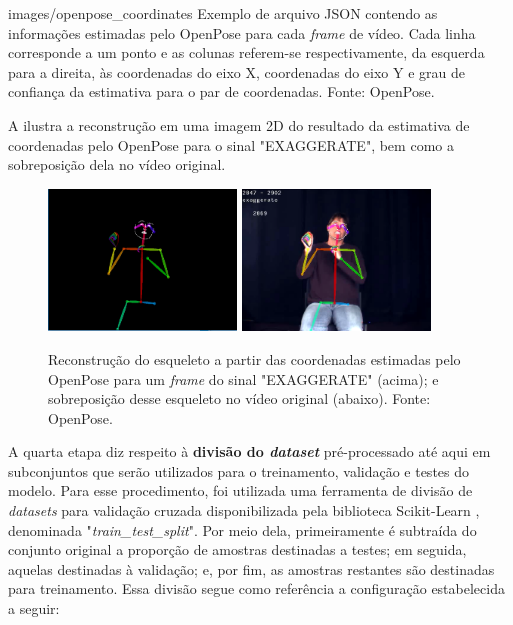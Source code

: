     {images/openpose_coordinates}
    {Exemplo de arquivo JSON contendo as informações estimadas pelo OpenPose para cada \textit{frame} de vídeo. Cada linha corresponde a um ponto e as colunas referem-se respectivamente, da esquerda para a direita, às coordenadas do eixo X, coordenadas do eixo Y e grau de confiança da estimativa para o par de coordenadas. Fonte: OpenPose.}

A  ilustra a reconstrução em uma imagem 2D do resultado da estimativa de coordenadas pelo OpenPose para o sinal "EXAGGERATE", bem como a sobreposição dela no vídeo original.

\begin{figure}[ht]
    \centering
    \includegraphics[width=5cm]{images/sign_pose}
    \includegraphics[width=5cm]{images/sign_pose_blended}
    \caption{Reconstrução do esqueleto a partir das coordenadas estimadas pelo OpenPose para um \textit{frame} do sinal "EXAGGERATE" (acima); e sobreposição desse esqueleto no vídeo original (abaixo). Fonte: OpenPose.}
    \label{fig:sign-pose}
\end{figure}

A quarta etapa diz respeito à \textbf{divisão do \textit{dataset}} pré-processado até aqui em subconjuntos que serão utilizados para o treinamento, validação e testes do modelo. Para esse procedimento, foi utilizada uma ferramenta de divisão de \textit{datasets} para validação cruzada disponibilizada pela biblioteca Scikit-Learn \cite{scikit-learn}, denominada "\textit{train\_test\_split}". Por meio dela, primeiramente é subtraída do conjunto original a proporção de amostras destinadas a testes; em seguida, aquelas destinadas à validação; e, por fim, as amostras restantes são destinadas para treinamento. Essa divisão segue como referência a configuração estabelecida a seguir:

